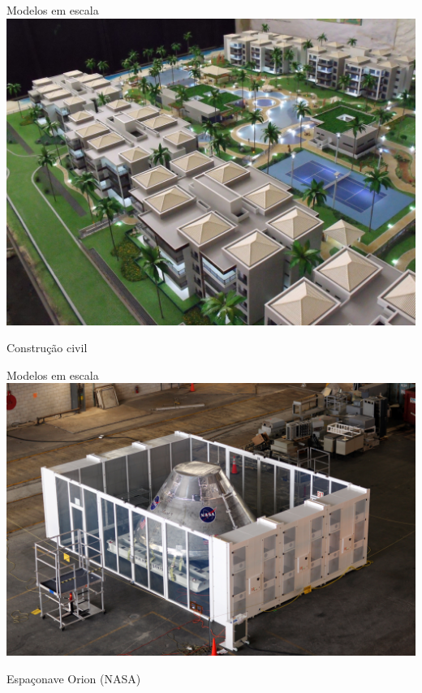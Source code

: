 \documentclass{beamer}
\begin{document}
\begin{frame}{Modelos em escala}
  \centering
  \includegraphics[height=.8\textheight]{modelos/maquetefisica-modopago}

Construção civil
\end{frame}

\begin{frame}{Modelos em escala}
  \centering
  \includegraphics[width=.9\textwidth]{modelos/Orion_engineering_model_in_VAB_clean_room_01}

Espaçonave Orion (NASA)
\end{frame}
\end{document}
